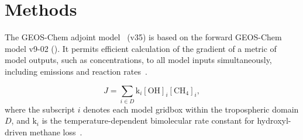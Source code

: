\section*{Methods}

The GEOS-Chem adjoint model~\cite{ref:henze2007} (v35) is based on the forward GEOS-Chem model v9-02 (\href{http://www.geos-chem.org}{}). It permits efficient calculation of the gradient of a metric of model outputs, such as concentrations, to all model inputs simultaneously, including emissions and reaction rates~\cite{ref:walker2015}.

\begin{equation}
J=\sum_{i \in D} \mathrm{k}_i \mathrm{[OH]}_i \mathrm{[CH_4]}_i,
\end{equation}
where the subscript $i$ denotes each model gridbox within the tropospheric domain $D$, and $\mathrm{k}_i$ is the temperature-dependent bimolecular rate constant for hydroxyl-driven methane loss~\citep{ref:sander2011}.
